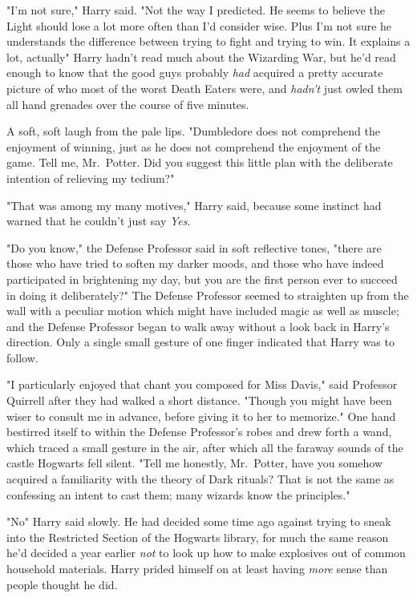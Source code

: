 "I'm not sure," Harry said. "Not the way I predicted. He seems to believe the
Light should lose a lot more often than I'd consider wise. Plus I'm not sure he
understands the difference between trying to fight and trying to win. It
explains a lot, actually{\el}" Harry hadn't read much about the Wizarding
War, but he'd read enough to know that the good guys probably \emph{had}
acquired a pretty accurate picture of who most of the worst Death Eaters were,
and \emph{hadn't} just owled them all hand grenades over the course of five
minutes.

A soft, soft laugh from the pale lips. "Dumbledore does not comprehend the
enjoyment of winning, just as he does not comprehend the enjoyment of the game.
Tell me, Mr.~Potter. Did you suggest this little plan with the deliberate
intention of relieving my tedium?"

"That was among my many motives," Harry said, because some instinct had warned
that he couldn't just say \emph{Yes}.

"Do you know," the Defense Professor said in soft reflective tones, "there are
those who have tried to soften my darker moods, and those who have indeed
participated in brightening my day, but you are the first person ever to
succeed in doing it deliberately?" The Defense Professor seemed to straighten
up from the wall with a peculiar motion which might have included magic as well
as muscle; and the Defense Professor began to walk away without a look back in
Harry's direction. Only a single small gesture of one finger indicated that
Harry was to follow.

"I particularly enjoyed that chant you composed for Miss Davis," said Professor
Quirrell after they had walked a short distance. "Though you might have been
wiser to consult me in advance, before giving it to her to memorize." One hand
bestirred itself to within the Defense Professor's robes and drew forth a wand,
which traced a small gesture in the air, after which all the faraway sounds of
the castle Hogwarts fell silent. "Tell me honestly, Mr.~Potter, have you
somehow acquired a familiarity with the theory of Dark rituals? That is not the
same as confessing an intent to cast them; many wizards know the principles."

"No{\el}" Harry said slowly. He had decided some time ago against trying to
sneak into the Restricted Section of the Hogwarts library, for much the same
reason he'd decided a year earlier \emph{not} to look up how to make explosives
out of common household materials. Harry prided himself on at least having
\emph{more} sense than people thought he did.

